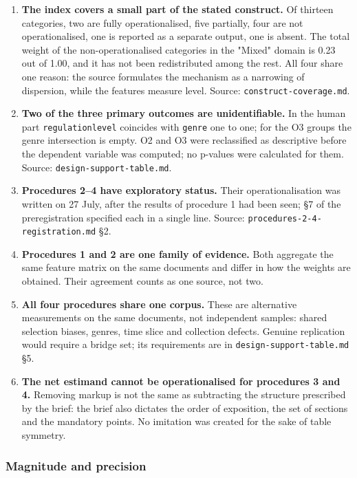 \documentclass[11pt,a4paper]{article}
\renewcommand{\_}{\textunderscore\allowbreak}
\begin{document}
\begin{enumerate}
\item[1.] \textbf{The index covers a small part of the stated construct.} Of thirteen categories, two are fully operationalised, five partially, four are not operationalised, one is reported as a separate output, one is absent. The total weight of the non-operationalised categories in the "Mixed" domain is 0.23 out of 1.00, and it has not been redistributed among the rest. All four share one reason: the source formulates the mechanism as a narrowing of dispersion, while the features measure level. Source: \texttt{construct-\allowbreak{}coverage.md}.
\item[2.] \textbf{Two of the three primary outcomes are unidentifiable.} In the human part \texttt{regulation\_level} coincides with \texttt{genre} one to one; for the O3 groups the genre intersection is empty. O2 and O3 were reclassified as descriptive before the dependent variable was computed; no p-values were calculated for them. Source: \texttt{design-\allowbreak{}support-\allowbreak{}table.md}.
\item[3.] \textbf{Procedures 2–4 have exploratory status.} Their operationalisation was written on 27 July, after the results of procedure 1 had been seen; §7 of the preregistration specified each in a single line. Source: \texttt{procedures-\allowbreak{}2-\allowbreak{}4-\allowbreak{}registration.md} §2.
\item[4.] \textbf{Procedures 1 and 2 are one family of evidence.} Both aggregate the same feature matrix on the same documents and differ in how the weights are obtained. Their agreement counts as one source, not two.
\item[5.] \textbf{All four procedures share one corpus.} These are alternative measurements on the same documents, not independent samples: shared selection biases, genres, time slice and collection defects. Genuine replication would require a bridge set; its requirements are in \texttt{design-\allowbreak{}support-\allowbreak{}table.md} §5.
\item[6.] \textbf{The net estimand cannot be operationalised for procedures 3 and 4.} Removing markup is not the same as subtracting the structure prescribed by the brief: the brief also dictates the order of exposition, the set of sections and the mandatory points. No imitation was created for the sake of table symmetry.
\end{enumerate}

\subsubsection{Magnitude and precision}
\end{document}
